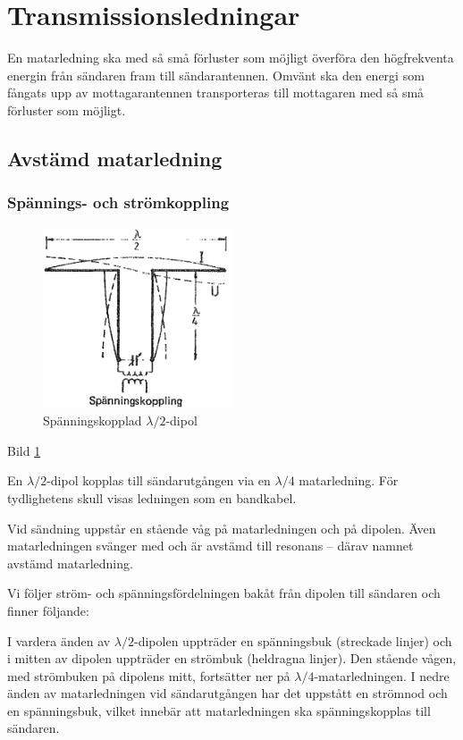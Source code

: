 \section{Transmissionsledningar}
\label{transmissionsledningar}

En matarledning ska med så små förluster som möjligt överföra den
högfrekventa energin från sändaren fram till sändarantennen.
Omvänt ska den energi som fångats upp av mottagarantennen transporteras
till mottagaren med så små förluster som möjligt.

\subsection{Avstämd matarledning}

\subsubsection{Spännings- och strömkoppling}

\begin{figure}
  \includegraphics[width=0.5\textwidth]{images/cropped_pdfs/bild_2_6-21.pdf}
  \caption{Spänningskopplad $\lambda/2$-dipol}
  \label{fig:bildII6-21}
\end{figure}

Bild \ref{fig:bildII6-21}

En \(\lambda/2\)-dipol kopplas till sändarutgången via en
\(\lambda/4\) matarledning. För tydlighetens skull visas ledningen som
en bandkabel.

Vid sändning uppstår en stående våg på matarledningen och på
dipolen. Även matarledningen svänger med och är avstämd till resonans
-- därav namnet avstämd matarledning.

Vi följer ström- och spänningsfördelningen bakåt från dipolen till
sändaren och finner följande:

I vardera änden av \(\lambda/2\)-dipolen uppträder en spänningsbuk
(streckade linjer) och i mitten av dipolen uppträder en strömbuk
(heldragna linjer). Den stående vågen, med strömbuken på dipolens
mitt, fortsätter ner på \(\lambda/4\)-matarledningen. I nedre änden av
matarledningen vid sändarutgången har det uppstått en strömnod och en
spänningsbuk, vilket innebär att matarledningen ska spänningskopplas
till sändaren.

